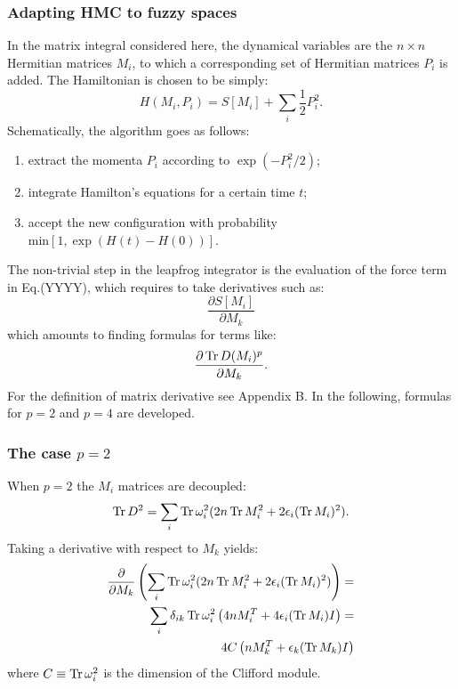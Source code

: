 \subsubsection{Adapting HMC to fuzzy spaces}
In the matrix integral considered here, the dynamical variables are the $n \times n$ Hermitian matrices $M_i$, to which a corresponding set of Hermitian matrices $P_i$ is added. The Hamiltonian is chosen to be simply:
\begin{equation} \label{eq:hamilt}
H(M_i, P_i) = S[M_i] + \sum_i \frac{1}{2}P_i^2.
\end{equation}
Schematically, the algorithm goes as follows:
\begin{enumerate}
\item extract the momenta $P_i$ according to $\exp(-P_i^2 / 2)$;
\item integrate Hamilton's equations for a certain time $t$;
\item accept the new configuration with probability $\text{min}[1, \exp (H(t)-H(0))]$.
\end{enumerate}
The non-trivial step in the leapfrog integrator is the evaluation of the force term in Eq.(YYYY), which requires to take derivatives such as:
\begin{equation}
\frac{\partial S[M_i]}{\partial M_k}
\end{equation}
which amounts to finding formulas for terms like:
\begin{equation}
\frac{\partial \operatorname{Tr} D(M_i)^p}{\partial M_k}.
\end{equation}
For the definition of matrix derivative see Appendix B. In the following, formulas for $p=2$ and $p=4$ are developed.

\subsubsection{The case $p=2$}
When $p = 2$ the $M_i$ matrices are decoupled:
\begin{equation}
\operatorname{Tr} D^2 = \sum_i \operatorname{Tr} \omega_i^2 (2 n \operatorname{Tr} M_i^2 + 2 \epsilon_i (\operatorname{Tr} M_i)^2).
\end{equation} 
Taking a derivative with respect to $M_k$ yields:
\begin{align}\label{eq:As}
\frac{\partial}{\partial M_k} \left( \sum_i \operatorname{Tr} \omega_i^2 (2 n \operatorname{Tr} M_i^2 + 2 \epsilon_i (\operatorname{Tr} M_i)^2) \right) = \notag \\
\sum_i \delta_{ik} \operatorname{Tr} \omega_i^2 \left( 4 n M_i^T + 4 \epsilon_i (\operatorname{Tr} M_i) I \right) = \notag \\
4 C \left( n M_k^T + \epsilon_k (\operatorname{Tr} M_k) I \right)
\end{align}
where $C \equiv \operatorname{Tr} \omega_i^2$ is the dimension of the Clifford module.

